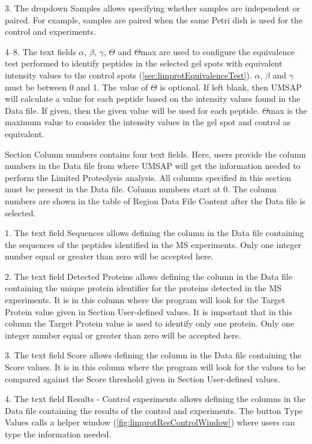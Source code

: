 \num{3}. The dropdown Samples allows specifying whether samples are independent
or paired. For example, samples are paired when the same Petri dish is used for the
control and experiments.

\numrange[range-phrase = --]{4}{8}. The text fields $\alpha$, $\beta$, $\gamma$,
$\Theta$ and $\Theta$max are used to configure the equivalence test \cite{Limentani2005a}
performed to identify peptides in the selected gel spots with equivalent intensity
values to the control spots (\autoref{sec:limprotEquivalenceTest}). $\alpha$, $\beta$ and 
$\gamma$ must be between \num{0} and \num{1}. The value of $\Theta$ is optional. If
left blank, then UMSAP will calculate a value for each peptide based on the intensity values
found in the Data file. If given, then the given value will be used for each peptide.
$\Theta$max is the maximum value to consider the intensity values in the gel spot
and control as equivalent.

Section Column numbers contains four text fields. Here, users provide the column
numbers in the Data file from where UMSAP will get the information needed to perform
the Limited Proteolysis analysis. All columns specified in this section must be present
in the Data file. Column numbers start at \num{0}. The column numbers are shown in
the table of Region Data File Content after the Data file is selected.

\num{1}. The text field Sequences allows defining the column in the Data
file containing the sequences of the peptides identified in the MS experiments.
Only one integer number equal or greater than zero will be accepted here.

\num{2}. The text field Detected Proteins allows defining the column in
the Data file containing the unique protein identifier for the proteins detected
in the MS experiments. It is in this column where the program will look for the
Target Protein value given in Section User-defined values. It is important that
in this column the Target Protein value is used to identify only one protein. Only
one integer number equal or greater than zero will be accepted here.

\num{3}. The text field Score allows defining the column in the Data file
containing the Score values. It is in this column where the program will look for
the values to be compared against the Score threshold given in Section User-defined
values.

\num{4}. \label{par:limprotResultControl}The text field Results - Control experiments
allows defining the columns in the Data file containing the results of the
control and experiments. The button Type Values calls a helper window
(\autoref{fig:limprotResControlWindow}) where users can type the information needed. 

